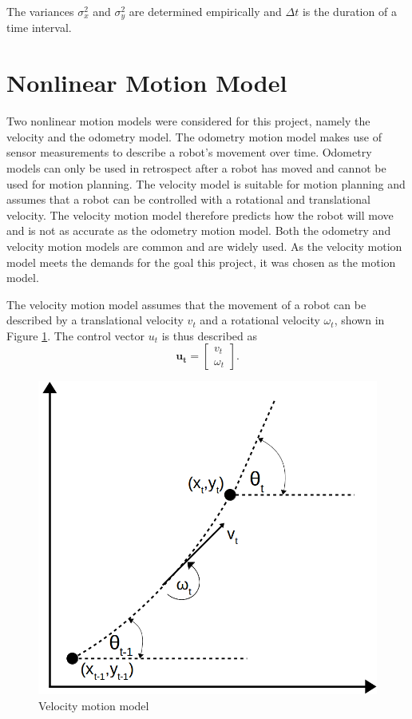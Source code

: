 \documentclass[12pt,oneside,openany,a4paper, %
afrikaans,english,
]{memoir}
\numberwithin{equation}{chapter}
\begin{document}
The variances $\sigma_x^2$ and $\sigma_y^2$ are determined empirically and $\Delta t$ is the duration of a time interval.


\section{Nonlinear Motion Model}\label{vmodel}
Two nonlinear motion models were considered for this project, namely the velocity and the odometry model. The odometry motion model makes use of sensor measurements to describe a robot's movement over time. Odometry models can  only be used in retrospect after a robot has moved and cannot be used for motion planning. The velocity model is suitable for motion planning and assumes that a robot can be controlled with a rotational and translational velocity. The velocity motion model therefore predicts how the robot will move and is not as accurate as the odometry motion model. Both the odometry and velocity motion models are common and are widely used. As the velocity motion model meets the demands for the goal this project, it was chosen as the motion model.

The velocity motion model assumes that the movement of a robot can be described by a translational velocity $v_t$ and a rotational velocity $\omega_t$, shown in Figure \ref{fig:vel_model}. The control vector $u_t$ is thus described as
\begin{equation}
\bm{u_t} = 
\begin{bmatrix}
v_t\\
\omega_t
\end{bmatrix}.
\end{equation}
\begin{figure}
  \includegraphics[width=0.4\linewidth]{Figures/velocity_model.png}
  \centering
  \caption{Velocity motion model}
  \label{fig:vel_model}
\end{figure}
\end{document}
